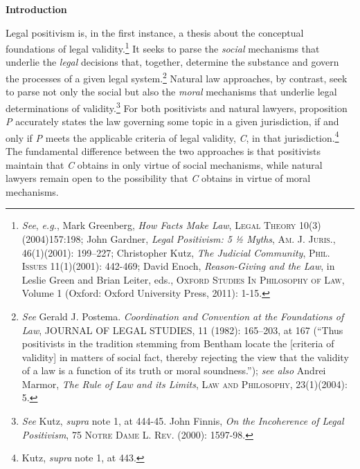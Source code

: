 \textbf{Introduction}

Legal positivism is, in the first instance, a thesis about the
conceptual foundations of legal validity.\footnote{\emph{See},
  \emph{e.g.}, Mark Greenberg, \emph{How Facts Make Law}, \textsc{Legal
  Theory} 10(3)(2004)157:198; John Gardner, \emph{Legal Positivism: 5 ½
  Myths}, A\textsc{m. J. Juris}., 46(1)(2001): 199--227; Christopher
  Kutz, \emph{The Judicial Community}, \textsc{Phil. Issues}
  11(1)(2001): 442-469; David Enoch, \emph{Reason-Giving and the Law},
  in Leslie Green and Brian Leiter, eds., \textsc{Oxford Studies In
  Philosophy of Law}, Volume 1 (Oxford: Oxford University Press, 2011):
  1-15.} It seeks to parse the \emph{social} mechanisms that underlie
the \emph{legal} decisions that, together, determine the substance and
govern the processes of a given legal system.\footnote{\emph{See} Gerald
  J. Postema. \emph{Coordination and Convention at the Foundations of
  Law}, JOURNAL OF LEGAL STUDIES, 11 (1982): 165--203, at 167 (``Thus
  positivists in the tradition stemming from Bentham locate the
  {[}criteria of validity{]} in matters of social fact, thereby
  rejecting the view that the validity of a law is a function of its
  truth or moral soundness.''); \emph{see also} Andrei Marmor, \emph{The
  Rule of Law and its Limits}, \textsc{Law and Philosophy}, 23(1)(2004):
  5.} Natural law approaches, by contrast, seek to parse not only the
social but also the \emph{moral} mechanisms that underlie legal
determinations of validity.\footnote{\emph{See} Kutz, \emph{supra} note
  1, at 444-45. John Finnis, \emph{On the Incoherence of Legal
  Positivism}, 75 \textsc{Notre Dame L. Rev.} (2000): 1597-98.} For both
positivists and natural lawyers, proposition \emph{P} accurately states
the law governing some topic in a given jurisdiction, if and only if
\emph{P} meets the applicable criteria of legal validity, \emph{C}, in
that jurisdiction.\footnote{Kutz, \emph{supra} note 1, at 443.} The
fundamental difference between the two approaches is that positivists
maintain that \emph{C} obtains in only virtue of social mechanisms,
while natural lawyers remain open to the possibility that \emph{C}
obtains in virtue of moral mechanisms.


